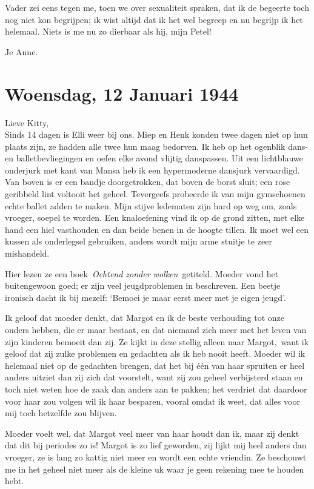 \documentclass{book}
\begin{document}
Vader zei eens tegen me, toen we over sexualiteit spraken, dat ik de begeerte
toch nog niet kon begrijpen; ik wist altijd dat ik het wel begreep en nu begrijp
ik het helemaal. Niets is me nu zo dierbaar als hij, mijn Petel!

Je Anne.

\section*{Woensdag, 12 Januari 1944}

Lieve Kitty,\\
Sinds 14 dagen is Elli weer bij ons. Miep en Henk konden twee
dagen niet op hun plaats zijn, ze hadden alle twee hun maag bedorven. Ik heb op
het ogenblik dans- en balletbevliegingen en oefen elke avond vlijtig danspassen.
Uit een lichtblauwe onderjurk met kant van Mansa heb ik een hypermoderne
dansjurk vervaardigd. Van boven is er een bandje doorgetrokken, dat boven de
borst sluit; een rose geribbeld lint voltooit het geheel. Tevergeefs probeerde
ik van mijn gymschoenen echte ballet adden te maken. Mijn stijve ledematen zijn
hard op weg om, zoals vroeger, soepel te worden. Een knaloefening vind ik op de
grond zitten, met elke hand een hiel vasthouden en dan beide benen in de hoogte
tillen. Ik moet wel een kussen als onderlegsel gebruiken, anders wordt mijn arme
stuitje te zeer mishandeld.

Hier lezen ze een boek~\emph{Ochtend zonder wolken}~getiteld. Moeder vond het
buitengewoon goed; er zijn veel jeugdproblemen in beschreven.  Een beetje
ironisch dacht ik bij mezelf: `Bemoei je maar eerst meer met je eigen jeugd'.

Ik geloof dat moeder denkt, dat Margot en ik de beste verhouding tot onze ouders
hebben, die er maar bestaat, en dat niemand zich meer met het leven van zijn
kinderen bemoeit dan zij. Ze kijkt in deze stellig alleen naar Margot,~want ik
geloof dat zij zulke problemen en gedachten als ik heb nooit heeft. Moeder wil
ik helemaal niet op de gedachten brengen, dat het bij één van haar spruiten er
heel anders uitziet dan zij zich dat voorstelt, want zij zou geheel verbijsterd
staan en toch niet weten hoe de zaak dan anders aan te pakken; het verdriet dat
daardoor voor haar zou volgen wil ik haar besparen, vooral omdat ik weet, dat
alles voor mij toch hetzelfde zou blijven.

Moeder voelt wel, dat Margot veel meer van haar houdt dan ik, maar zij denkt dat
dit bij periodes zo is! Margot is zo lief geworden, zij lijkt mij heel anders
dan vroeger, ze is lang zo kattig niet meer en wordt een echte vriendin. Ze
beschouwt me in het geheel niet meer als de kleine uk waar je geen rekening mee
te houden hebt.
\end{document}
